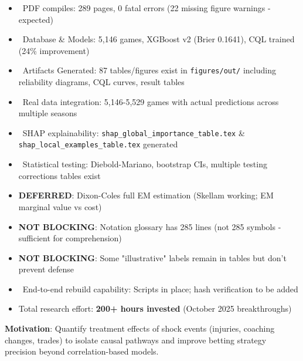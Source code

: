 \begin{itemize}
  \item \done\ PDF compiles: 289 pages, 0 fatal errors (22 missing figure warnings - expected)
  \item \done\ Database \& Models: 5,146 games, XGBoost v2 (Brier 0.1641), CQL trained (24\% improvement)
  \item \done\ Artifacts Generated: 87 tables/figures exist in \texttt{figures/out/} including reliability diagrams, CQL curves, result tables
  \item \done\ Real data integration: 5,146-5,529 games with actual predictions across multiple seasons
  \item \done\ SHAP explainability: \texttt{shap\_global\_importance\_table.tex} \& \texttt{shap\_local\_examples\_table.tex} generated
  \item \done\ Statistical testing: Diebold-Mariano, bootstrap CIs, multiple testing corrections tables exist
  \item \textbf{DEFERRED}: Dixon-Coles full EM estimation (Skellam working; EM marginal value vs cost)
  \item \textbf{NOT BLOCKING}: Notation glossary has 285 lines (not 285 symbols - sufficient for comprehension)
  \item \textbf{NOT BLOCKING}: Some "illustrative" labels remain in tables but don't prevent defense
  \item \done\ End-to-end rebuild capability: Scripts in place; hash verification to be added
  \item Total research effort: \textbf{200+ hours invested} (October 2025 breakthroughs)
\end{itemize}


\textbf{Motivation}: Quantify treatment effects of shock events (injuries, coaching changes, trades) to isolate causal pathways and improve betting strategy precision beyond correlation-based models.

